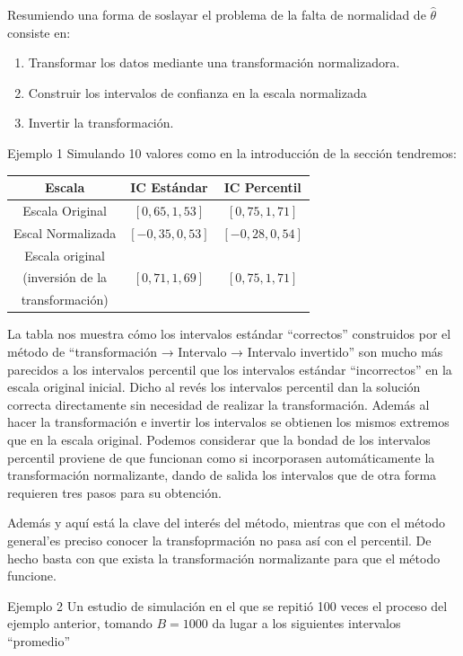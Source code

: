 \documentclass[
]{article}
\providecommand{\tightlist}{%
  \setlength{\itemsep}{0pt}\setlength{\parskip}{0pt}}
\begin{document}
Resumiendo una forma de soslayar el problema de la falta de normalidad de \(\hat{\theta}\) consiste en:

\begin{enumerate}
\def\labelenumi{\arabic{enumi}.}
\tightlist
\item
  Transformar los datos mediante una transformación normalizadora.
\item
  Construir los intervalos de confianza en la escala normalizada
\item
  Invertir la transformación.
\end{enumerate}

Ejemplo 1 Simulando 10 valores como en la introducción de la sección tendremos:

\begin{longtable}[]{@{}ccc@{}}
\toprule\noalign{}
Escala & IC Estándar & IC Percentil \\
\midrule\noalign{}
\endhead
\bottomrule\noalign{}
\endlastfoot
Escala Original & \([0,65,1,53]\) & \([0,75,1,71]\) \\
Escal Normalizada & \([-0,35,0,53]\) & \([-0,28,0,54]\) \\
Escala original & & \\
(inversión de la & \([0,71,1,69]\) & \([0,75,1,71]\) \\
transformación) & & \\
\end{longtable}

La tabla nos muestra cómo los intervalos estándar ``correctos'' construidos por el método de
``transformación → Intervalo → Intervalo invertido''
son mucho más parecidos a los intervalos percentil que los intervalos estándar ``incorrectos'' en la escala original inicial. Dicho al revés los intervalos percentil dan la solución correcta directamente sin necesidad de realizar la transformación. Además al hacer la transformación e invertir los intervalos se obtienen los mismos extremos que en la escala original. Podemos considerar que la bondad de los intervalos percentil proviene de que funcionan como si incorporasen automáticamente la transformación normalizante, dando de salida los intervalos que de otra forma requieren tres pasos para su obtención.

Además y aquí está la clave del interés del método, mientras que con el método general'es preciso conocer la transfoprmación no pasa así con el percentil. De hecho basta con que exista la transformación normalizante para que el método funcione.

Ejemplo 2 Un estudio de simulación en el que se repitió 100 veces el proceso del ejemplo anterior, tomando \(B=1000\) da lugar a los siguientes intervalos ``promedio''
\end{document}

